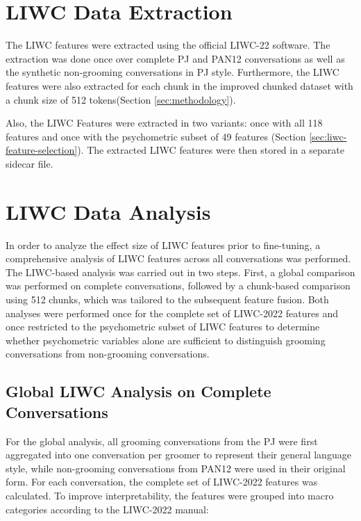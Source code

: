 \section{LIWC Data Extraction}

The LIWC features were extracted using the official LIWC-22 software. The extraction was done once over complete PJ and PAN12 conversations as well as the synthetic non-grooming conversations in PJ style. Furthermore, the LIWC features were also extracted for each chunk in the improved chunked dataset with a chunk size of 512 tokens(Section \ref{sec:methodology}).

Also, the LIWC Features were extracted in two variants: once with all 118 features and once with the psychometric subset of 49 features (Section \ref{sec:liwc-feature-selection}). The extracted LIWC features were then stored in a separate sidecar file.

\section{LIWC Data Analysis}

In order to analyze the effect size of LIWC features prior to fine-tuning, a comprehensive analysis of LIWC features across all conversations was performed.
The LIWC-based analysis was carried out in two steps. First, a global comparison was performed on complete conversations, followed by a chunk-based comparison using 512 chunks, which was tailored to the subsequent feature fusion. Both analyses were performed once for the complete set of LIWC-2022 features and once restricted to the psychometric subset of LIWC features to determine whether psychometric variables alone are sufficient to distinguish grooming conversations from non-grooming conversations.

\subsection{Global LIWC Analysis on Complete Conversations}

For the global analysis, all grooming conversations from the PJ were first aggregated into one conversation per groomer to represent their general language style, while non-grooming conversations from PAN12 were used in their original form. 
For each conversation, the complete set of LIWC-2022 features was calculated.  
To improve interpretability, the features were grouped into macro categories according to the LIWC-2022 manual:

